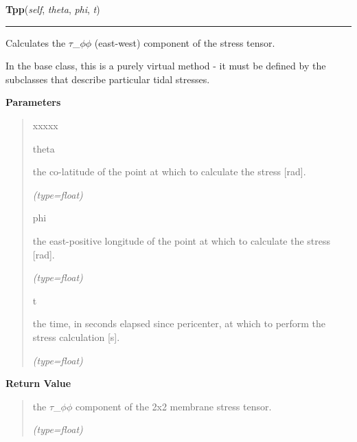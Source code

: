     \label{SatStress:SatStress:StressDef:Tpp}

    \vspace{0.5ex}

\hspace{.8\funcindent}\begin{boxedminipage}{\funcwidth}

    \raggedright \textbf{Tpp}(\textit{self}, \textit{theta}, \textit{phi}, \textit{t})

    \vspace{-1.5ex}

    \rule{\textwidth}{0.5\fboxrule}
\setlength{\parskip}{2ex}
    Calculates the \(\tau\)\_\(\phi\)\(\phi\) (east-west) component of the 
    stress tensor.

    In the base class, this is a purely virtual method - it must be defined
    by the subclasses that describe particular tidal stresses.

\setlength{\parskip}{1ex}
      \textbf{Parameters}
      \vspace{-1ex}

      \begin{quote}
        \begin{Ventry}{xxxxx}

          \item[theta]

          the co-latitude of the point at which to calculate the stress 
          [rad].

            {\it (type=float)}

          \item[phi]

          the east-positive longitude of the point at which to calculate 
          the stress [rad].

            {\it (type=float)}

          \item[t]

          the time, in seconds elapsed since pericenter, at which to 
          perform the stress calculation [s].

            {\it (type=float)}

        \end{Ventry}

      \end{quote}

      \textbf{Return Value}
    \vspace{-1ex}

      \begin{quote}
      the \(\tau\)\_\(\phi\)\(\phi\) component of the 2x2 membrane stress 
      tensor.

      {\it (type=float)}

      \end{quote}

    \end{boxedminipage}

